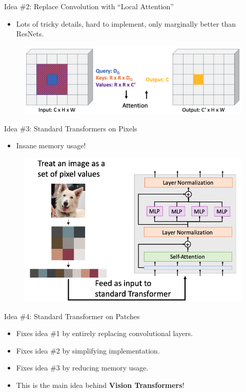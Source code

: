 \begin{frame}{Idea \#2: Replace Convolution with “Local Attention”}
    \begin{itemize}
        \item Lots of tricky details, hard to implement, only marginally better than ResNets.
    \end{itemize}
    \begin{figure}
        \centering
        \includegraphics[width=\linewidth]{pic/idea2}
        \label{fig:idea1}
    \end{figure}
\end{frame}


\begin{frame}{Idea \#3: Standard Transformers on Pixels}
    \begin{itemize}
        \item Insane memory usage!
    \end{itemize}
    \begin{figure}
        \centering
        \includegraphics[width=0.5\linewidth]{pic/idea3}
        \label{fig:idea1}
    \end{figure}
\end{frame}


\begin{frame}{Idea \#4: Standard Transformer on Patches}
    \begin{itemize}
        \item Fixes idea \#1 by entirely replacing convolutional layers.
        \item Fixes idea \#2 by simplifying implementation.
        \item Fixes idea \#3 by reducing memory usage.
        \item This is the main idea behind \textbf{Vision Transformers}!
    \end{itemize}
\end{frame}